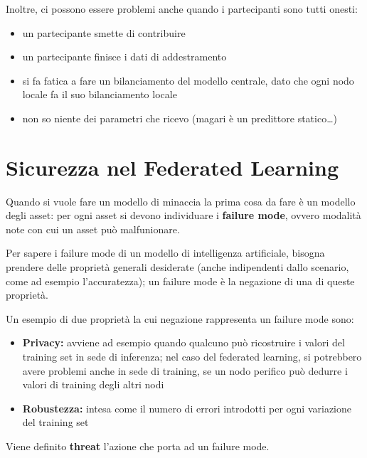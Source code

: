 \documentclass{report}
\begin{document}
\noindent Inoltre, ci possono essere problemi anche quando i partecipanti sono tutti onesti:
\begin{itemize}
    \item un partecipante smette di contribuire 
    \item un partecipante finisce i dati di addestramento 
    \item si fa fatica a fare un bilanciamento del modello centrale, dato che ogni nodo locale fa il suo bilanciamento locale 
    \item non so niente dei parametri che ricevo (magari è un predittore statico\dots)
\end{itemize}


\section{Sicurezza nel Federated Learning}

Quando si vuole fare un modello di minaccia la prima cosa da fare è un modello degli asset: per ogni asset si devono individuare i 
\textbf{failure mode}, ovvero modalità note con cui un asset può malfunionare.

\noindent Per sapere i failure mode di un modello di intelligenza artificiale, bisogna prendere delle proprietà generali desiderate (anche 
indipendenti dallo scenario, come 
ad esempio l'accuratezza); un failure mode è la negazione di una di queste proprietà.

\noindent Un esempio di due proprietà la cui negazione rappresenta un failure mode sono:
\begin{itemize}
    \item \textbf{Privacy:} avviene ad esempio quando qualcuno può ricostruire i valori del training set in sede di inferenza; nel caso del federated learning,
    si potrebbero avere problemi anche in sede di training, se un nodo perifico può dedurre i valori di training degli altri nodi 
    \item \textbf{Robustezza:} intesa come il numero di errori introdotti per ogni variazione del training set
\end{itemize}

\noindent Viene definito \textbf{threat} l'azione che porta ad un failure mode.
\end{document}
